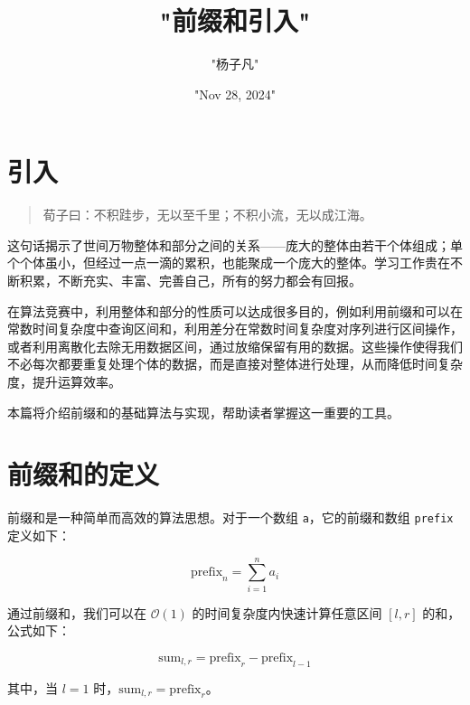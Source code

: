 \title{"前缀和引入"}
\author{"杨子凡"}
\date{"Nov 28, 2024"}
\maketitle
\chapter{引入}
\begin{quote}
荀子曰：不积跬步，无以至千里；不积小流，无以成江海。\par
\end{quote}
这句话揭示了世间万物整体和部分之间的关系——庞大的整体由若干个体组成；单个个体虽小，但经过一点一滴的累积，也能聚成一个庞大的整体。学习工作贵在不断积累，不断充实、丰富、完善自己，所有的努力都会有回报。\par
在算法竞赛中，利用整体和部分的性质可以达成很多目的，例如利用前缀和可以在常数时间复杂度中查询区间和，利用差分在常数时间复杂度对序列进行区间操作，或者利用离散化去除无用数据区间，通过放缩保留有用的数据。这些操作使得我们不必每次都要重复处理个体的数据，而是直接对整体进行处理，从而降低时间复杂度，提升运算效率。\par
本篇将介绍前缀和的基础算法与实现，帮助读者掌握这一重要的工具。\par
\chapter{前缀和的定义}
前缀和是一种简单而高效的算法思想。对于一个数组 \verb!a!，它的前缀和数组 \verb!prefix! 定义如下：\par
$$ \mathrm{prefix}_n = \sum _{i=1} ^{n} a_i $$\par
通过前缀和，我们可以在 $\mathcal{O}(1)$ 的时间复杂度内快速计算任意区间 $[l, r]$ 的和，公式如下：\par
$$ \mathrm{sum}_{l,r} = \mathrm{prefix}_r - \mathrm{prefix}_{l-1} $$\par
其中，当 $l = 1$ 时，$\mathrm{sum}_{l,r} = \mathrm{prefix}_r$。\par
